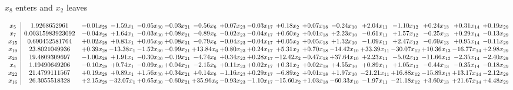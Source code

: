 \documentclass[9pt]{article}
\begin{document}
 $ x_{8} $ enters and $ x_{2} $ leaves 

 \[\begin{array}{c| c c@{\hskip 2pt} c@{\hskip 2pt} c@{\hskip 2pt} c@{\hskip 2pt} c@{\hskip 2pt} c@{\hskip 2pt} c@{\hskip 2pt} c@{\hskip 2pt} c@{\hskip 2pt} c@{\hskip 2pt} c@{\hskip 2pt} c@{\hskip 2pt} c@{\hskip 2pt} c@{\hskip 2pt} c@{\hskip 2pt} }
 x_{5}   &  1.9268652961 & -0.01 x_{28} & -1.59 x_{1} & -0.05 x_{30} & -0.03 x_{21} & -0.56 x_{6} & +  0.07 x_{23} & -0.03 x_{17} & +  0.18 x_{2} & +  0.07 x_{18} & -0.24 x_{10} & +  2.04 x_{11} & -1.10 x_{12} & +  0.24 x_{13} & +  0.31 x_{14} & +  0.19 x_{29}\\
 x_{7}   &  0.00315983923092 & -0.04 x_{28} & +  1.64 x_{1} & -0.03 x_{30} & +  0.08 x_{21} & -0.89 x_{6} & -0.02 x_{23} & -0.04 x_{17} & +  0.60 x_{2} & +  0.01 x_{18} & +  2.23 x_{10} & -0.61 x_{11} & +  1.57 x_{12} & -0.25 x_{13} & +  0.29 x_{14} & -0.13 x_{29}\\
 x_{15}   &  0.690452581764 & +  0.02 x_{28} & +  0.83 x_{1} & +  0.05 x_{30} & +  0.08 x_{21} & -0.79 x_{6} & -0.04 x_{23} & -0.04 x_{17} & +  0.05 x_{2} & +  0.05 x_{18} & +  1.32 x_{10} & -1.09 x_{11} & +  2.47 x_{12} & -0.69 x_{13} & +  0.95 x_{14} & -0.11 x_{29}\\
 x_{19}   &  23.8021049936 & +  0.39 x_{28} & -13.38 x_{1} & -1.52 x_{30} & -0.99 x_{21} & + 13.84 x_{6} & +  0.80 x_{23} & +  0.24 x_{17} & +  5.31 x_{2} & +  0.70 x_{18} & -14.42 x_{10} & + 33.39 x_{11} & -30.07 x_{12} & + 10.36 x_{13} & -16.77 x_{14} & +  2.98 x_{29}\\
 x_{20}   &  19.4809309697 & -1.00 x_{28} & +  1.91 x_{1} & -0.30 x_{30} & -0.19 x_{21} & -4.74 x_{6} & +  0.34 x_{23} & +  0.28 x_{17} & -12.42 x_{2} & -0.47 x_{18} & + 37.64 x_{10} & +  2.23 x_{11} & -5.02 x_{12} & -11.66 x_{13} & -2.35 x_{14} & -2.40 x_{29}\\
 x_{4}   &  1.19490649206 & -0.10 x_{28} & +  0.74 x_{1} & -0.09 x_{30} & +  0.04 x_{21} & -2.15 x_{6} & +  0.11 x_{23} & +  0.02 x_{17} & +  0.31 x_{2} & +  0.02 x_{18} & +  4.55 x_{10} & +  0.89 x_{11} & +  1.05 x_{12} & -0.44 x_{13} & -0.35 x_{14} & -0.18 x_{29}\\
 x_{22}   &  21.4799111567 & +  0.19 x_{28} & +  0.89 x_{1} & +  1.56 x_{30} & +  0.34 x_{21} & +  0.14 x_{6} & -1.16 x_{23} & +  0.29 x_{17} & -6.89 x_{2} & +  0.01 x_{18} & +  1.97 x_{10} & -21.21 x_{11} & + 16.88 x_{12} & -15.89 x_{13} & + 13.17 x_{14} & -2.12 x_{29}\\
 x_{16}   &  26.3055518328 & +  2.15 x_{28} & -32.07 x_{1} & +  0.65 x_{30} & -0.60 x_{21} & + 35.96 x_{6} & -0.93 x_{23} & -1.10 x_{17} & -15.60 x_{2} & +  1.03 x_{18} & -60.33 x_{10} & -1.97 x_{11} & -21.18 x_{12} & +  3.60 x_{13} & + 21.67 x_{14} & +  4.48 x_{29}\\

\end{array}\]
\end{document}
